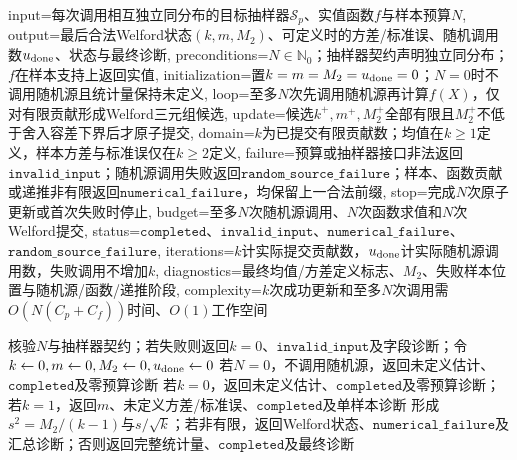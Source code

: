 \begin{AlgorithmContract}{
  input={每次调用相互独立同分布的目标抽样器$\mathcal S_p$、实值函数$f$与样本预算$N$},
  output={最后合法Welford状态$(k,m,M_2)$、可定义时的方差/标准误、随机调用数$u_{\rm done}$、状态与最终诊断},
  preconditions={$N\in\mathbb N_0$；抽样器契约声明独立同分布；$f$在样本支持上返回实值},
  initialization={置$k=m=M_2=u_{\rm done}=0$；$N=0$时不调用随机源且统计量保持未定义},
  loop={至多$N$次先调用随机源再计算$f(X)$，仅对有限贡献形成Welford三元组候选},
  update={候选$k^+,m^+,M_2^+$全部有限且$M_2^+$不低于舍入容差下界后才原子提交},
  domain={$k$为已提交有限贡献数；均值在$k\ge1$定义，样本方差与标准误仅在$k\ge2$定义},
  failure={预算或抽样器接口非法返回$\mathtt{invalid\_input}$；随机源调用失败返回$\mathtt{random\_source\_failure}$；样本、函数贡献或递推非有限返回$\mathtt{numerical\_failure}$，均保留上一合法前缀},
  stop={完成$N$次原子更新或首次失败时停止},
  budget={至多$N$次随机源调用、$N$次函数求值和$N$次Welford提交},
  status={$\mathtt{completed}$、$\mathtt{invalid\_input}$、$\mathtt{numerical\_failure}$、$\mathtt{random\_source\_failure}$},
  iterations={$k$计实际提交贡献数，$u_{\rm done}$计实际随机源调用数，失败调用不增加$k$},
  diagnostics={最终均值/方差定义标志、$M_2$、失败样本位置与随机源/函数/递推阶段},
  complexity={$k$次成功更新和至多$N$次调用需$O(N(C_p+C_f))$时间、$O(1)$工作空间}
}
\begin{algorithm}[!t]
\caption{独立蒙特卡罗均值与Welford在线诊断}\label{alg:V5-C02-iid-mc-online}
核验$N$与抽样器契约；若失败则返回$k=0$、$\mathtt{invalid\_input}$及字段诊断；令$k\leftarrow0,m\leftarrow0,M_2\leftarrow0,u_{\rm done}\leftarrow0$\;
若$N=0$，不调用随机源，返回未定义估计、$\mathtt{completed}$及零预算诊断\;
若$k=0$，返回未定义估计、$\mathtt{completed}$及零预算诊断；若$k=1$，返回$m$、未定义方差/标准误、$\mathtt{completed}$及单样本诊断\;
形成$s^2=M_2/(k-1)$与$s/\sqrt{k}$；若非有限，返回Welford状态、$\mathtt{numerical\_failure}$及汇总诊断；否则返回完整统计量、$\mathtt{completed}$及最终诊断\;
\end{algorithm}
\end{AlgorithmContract}
\endgroup

